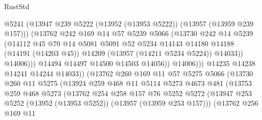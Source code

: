 \begin{lexlean}{RustStd}
\begin{coremodule}
                              @5241
                              (@13947
                                @239
                                @5222
                                (@13952 (@13953 @5222))
                                (@13957 (@13959 @239 @157)))
                              (@13762
                                @242
                                @169
                                @14
                                @57
                                @5239
                                @5066
                                (@13730
                                  @242
                                  @14
                                  @5239
                                  (@14112
                                    @45
                                    @70
                                    @14
                                    @5081
                                    @5091
                                    @52
                                    @5234
                                    @14143
                                    @14180
                                    @14188
                                    (@14191 (@14203 @45))
                                    @14209
                                    (@13957 (@14211 @5234 @5224))
                                    @14033))
                                @14006)))
                          @14494
                          @14497
                          @14500
                          @14503
                          @14056))
                      @14006)))
                @14235
                @14238
                @14241
                @14244
                @14033))
            (@13762
              @260
              @169
              @11
              @57
              @5275
              @5066
              (@13730
                @260
                @11
                @5275
                (@13924
                  @259
                  @468
                  @11
                  @5114
                  @5273
                  @4673
                  @481
                  (@13753
                    @259
                    @468
                    @5273
                    (@13762
                      @254
                      @258
                      @157
                      @76
                      @5252
                      @5272
                      (@13947 @253 @5252 (@13952 (@13953 @5252)) (@13957 (@13959 @253 @157)))
                      (@13762
                        @256
                        @169
                        @11

\end{coremodule}
\end{lexlean}

